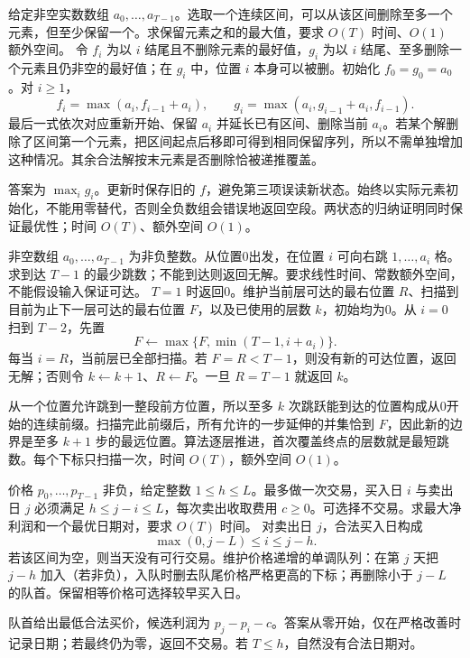给定非空实数数组 $a_0,\ldots,a_{T-1}$。选取一个连续区间，可以从该区间删除至多一个元素，但至少保留一个。求保留元素之和的最大值，要求 $O(T)$ 时间、$O(1)$ 额外空间。
\solution 令 $f_i$ 为以 $i$ 结尾且不删除元素的最好值，$g_i$ 为以 $i$ 结尾、至多删除一个元素且仍非空的最好值；在 $g_i$ 中，位置 $i$ 本身可以被删。初始化 $f_0=g_0=a_0$。对 $i\ge1$，
\[
f_i=\max(a_i,f_{i-1}+a_i),\qquad
g_i=\max(a_i,g_{i-1}+a_i,f_{i-1}).
\]
最后一式依次对应重新开始、保留 $a_i$ 并延长已有区间、删除当前 $a_i$。若某个解删除了区间第一个元素，把区间起点后移即可得到相同保留序列，所以不需单独增加这种情况。其余合法解按末元素是否删除恰被递推覆盖。

答案为 $\max_i g_i$。更新时保存旧的 $f$，避免第三项误读新状态。始终以实际元素初始化，不能用零替代，否则全负数组会错误地返回空段。两状态的归纳证明同时保证最优性；时间 $O(T)$、额外空间 $O(1)$。

非空数组 $a_0,\ldots,a_{T-1}$ 为非负整数。从位置0出发，在位置 $i$ 可向右跳 $1,\ldots,a_i$ 格。求到达 $T-1$ 的最少跳数；不能到达则返回无解。要求线性时间、常数额外空间，不能假设输入保证可达。
\solution $T=1$ 时返回0。维护当前层可达的最右位置 $R$、扫描到目前为止下一层可达的最右位置 $F$，以及已使用的层数 $k$，初始均为0。从 $i=0$ 扫到 $T-2$，先置
\[
F\leftarrow\max\{F,\min(T-1,i+a_i)\}.
\]
每当 $i=R$，当前层已全部扫描。若 $F=R<T-1$，则没有新的可达位置，返回无解；否则令 $k\leftarrow k+1$、$R\leftarrow F$。一旦 $R=T-1$ 就返回 $k$。

从一个位置允许跳到一整段前方位置，所以至多 $k$ 次跳跃能到达的位置构成从0开始的连续前缀。扫描完此前缀后，所有允许的一步延伸的并集恰到 $F$，因此新的边界是至多 $k+1$ 步的最远位置。算法逐层推进，首次覆盖终点的层数就是最短跳数。每个下标只扫描一次，时间 $O(T)$，额外空间 $O(1)$。

价格 $p_0,\ldots,p_{T-1}$ 非负，给定整数 $1\le h\le L$。最多做一次交易，买入日 $i$ 与卖出日 $j$ 必须满足 $h\le j-i\le L$，每次卖出收取费用 $c\ge0$。可选择不交易。求最大净利润和一个最优日期对，要求 $O(T)$ 时间。
\solution 对卖出日 $j$，合法买入日构成
\[
\max(0,j-L)\le i\le j-h.
\]
若该区间为空，则当天没有可行交易。维护价格递增的单调队列：在第 $j$ 天把 $j-h$ 加入（若非负），入队时删去队尾价格严格更高的下标；再删除小于 $j-L$ 的队首。保留相等价格可选择较早买入日。

队首给出最低合法买价，候选利润为 $p_j-p_i-c$。答案从零开始，仅在严格改善时记录日期；若最终仍为零，返回不交易。若 $T\le h$，自然没有合法日期对。

